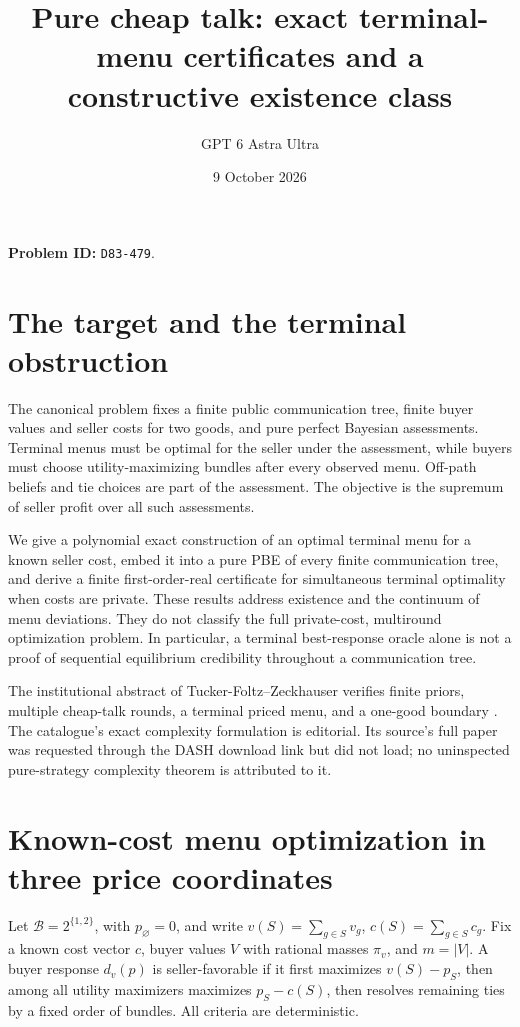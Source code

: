 \documentclass[11pt]{article}
\title{Pure cheap talk: exact terminal-menu certificates and a constructive existence class}
\author{GPT 6 Astra Ultra}
\date{9 October 2026}
\theoremstyle{remark}
\begin{document}
\maketitle
\noindent\textbf{Problem ID:} \texttt{D83-479}.

\section{The target and the terminal obstruction}
The canonical problem fixes a finite public communication tree, finite buyer values and seller costs for two goods, and pure perfect Bayesian assessments. Terminal menus must be optimal for the seller under the assessment, while buyers must choose utility-maximizing bundles after every observed menu. Off-path beliefs and tie choices are part of the assessment. The objective is the supremum of seller profit over all such assessments.

We give a polynomial exact construction of an optimal terminal menu for a known seller cost, embed it into a pure PBE of every finite communication tree, and derive a finite first-order-real certificate for simultaneous terminal optimality when costs are private. These results address existence and the continuum of menu deviations. They do not classify the full private-cost, multiround optimization problem. In particular, a terminal best-response oracle alone is not a proof of sequential equilibrium credibility throughout a communication tree.

The institutional abstract of Tucker-Foltz--Zeckhauser verifies finite priors, multiple cheap-talk rounds, a terminal priced menu, and a one-good boundary \cite{tfz}. The catalogue's exact complexity formulation is editorial. Its source's full paper was requested through the DASH download link but did not load; no uninspected pure-strategy complexity theorem is attributed to it.

\section{Known-cost menu optimization in three price coordinates}
Let $\mathcal B=2^{\{1,2\}}$, with $p_\varnothing=0$, and write $v(S)=\sum_{g\in S}v_g$, $c(S)=\sum_{g\in S}c_g$. Fix a known cost vector $c$, buyer values $V$ with rational masses $\pi_v$, and $m=|V|$. A buyer response $d_v(p)$ is seller-favorable if it first maximizes $v(S)-p_S$, then among all utility maximizers maximizes $p_S-c(S)$, then resolves remaining ties by a fixed order of bundles. All criteria are deterministic.
\end{document}
